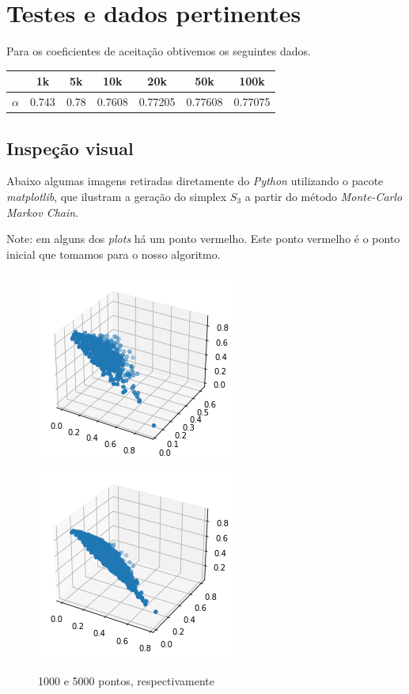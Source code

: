 \documentclass[12pt, a4paper]{article}
\begin{document}
\section{Testes e dados pertinentes}
Para os coeficientes de aceitação obtivemos os seguintes dados.

\begin{center}
\begin{tabular}{|c|c|c|c|c|c|c|}
\hline
& 1k & 5k & 10k& 20k & 50k & 100k \\
\hline
$\alpha$ & 0.743& 0.78 & 0.7608 & 0.77205 & 0.77608 & 0.77075 \\
\hline
\end{tabular}
\end{center}

\subsection{Inspeção visual}
Abaixo algumas imagens retiradas diretamente do \textit{Python} utilizando o pacote \textit{matplotlib}, que ilustram a geração do simplex $S_3$ a partir do método \textit{Monte-Carlo Markov Chain}.

Note: em alguns dos \textit{plots} há um ponto vermelho. Este ponto vermelho é o ponto inicial que tomamos para o nosso algoritmo. 

\begin{figure}[H]
\centering
\includegraphics[scale = 0.7]{1K.png}
\includegraphics[scale = 0.7]{5K.png}
\caption{1000 e 5000 pontos, respectivamente}
\end{figure}
\end{document}
